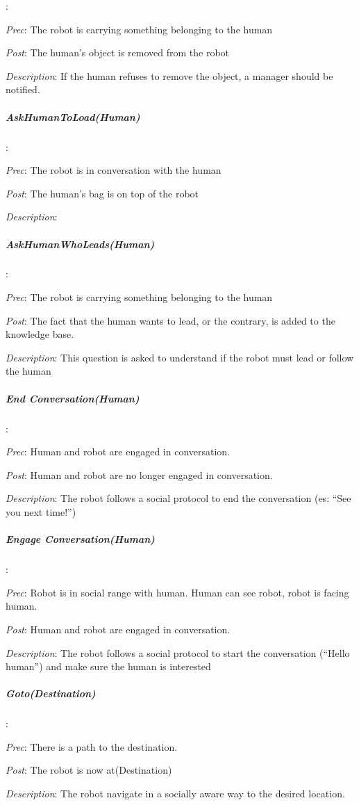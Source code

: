 :

\textit{Prec}: The robot is carrying something belonging to the human

\textit{Post}: The human's object is removed from the robot

\textit{Description}: If the human refuses to remove the object, a
manager should be notified.


\subparagraph{AskHumanToLoad(Human)}

:

\textit{Prec}: The robot is in conversation with the human

\textit{Post}: The human's bag is on top of the robot

\textit{Description}:


\subparagraph{AskHumanWhoLeads(Human)}

:

\textit{Prec}: The robot is carrying something belonging to the human

\textit{Post}: The fact that the human wants to lead, or the contrary,
is added to the knowledge base.

\textit{Description}: This question is asked to understand if the
robot must lead or follow the human

 


\subparagraph{End Conversation(Human)}

:

\textit{Prec}: Human and robot are engaged in conversation.

\textit{Post}: Human and robot are no longer engaged in conversation.

\textit{Description}: The robot follows a social protocol to end the
conversation (es: ``See you next time!'')


\subparagraph{Engage Conversation(Human)}

:

\textit{Prec}: Robot is in social range with human. Human can see
robot, robot is facing human.

\textit{Post}: Human and robot are engaged in conversation.

\textit{Description}: The robot follows a social protocol to start
the conversation (``Hello human'') and make sure the human is interested


\subparagraph{Goto(Destination)}

:

\textit{Prec}: There is a path to the destination.

\textit{Post}: The robot is now at(Destination)

\textit{Description}: The robot navigate in a socially aware way to
the desired location.




